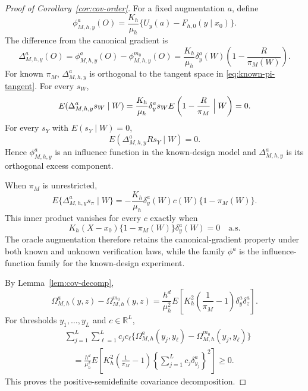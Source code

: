 \begin{proof}[Proof of Corollary~\ref{cor:cov-order}]
For a fixed augmentation \(a\), define
\[
\phi_{M,h,y}^{a}(O)
=
\frac{K_h}{\mu_h}
\{U_y(a)-F_{h,0}(y\mid x_0)\}.
\]
The difference from the canonical gradient is
\begin{equation}
\Delta_{M,h,y}^{a}(O)
=
\phi_{M,h,y}^{a}(O)-\phi_{M,h,y}^{m_0}(O)
=
\frac{K_h}{\mu_h}\delta_y^a(W)
\left(1-\frac{R}{\pi_M(W)}\right).
\label{eq:augmentation-orthogonal-component}
\end{equation}
For known \(\pi_M\), \(\Delta_{M,h,y}^{a}\) is orthogonal to the tangent space in \eqref{eq:known-pi-tangent}. For every \(s_W\),
\[
E(\Delta_{M,h,y}^{a}s_W\mid W)
=
\frac{K_h}{\mu_h}\delta_y^as_W
E\left(1-\frac{R}{\pi_M}\Bigm|W\right)=0.
\]
For every \(s_Y\) with \(E(s_Y\mid W)=0\),
\[
E(\Delta_{M,h,y}^{a}R s_Y\mid W)=0.
\]
Hence \(\phi_{M,h,y}^{a}\) is an influence function in the known-design model and \(\Delta_{M,h,y}^{a}\) is its orthogonal excess component.

When \(\pi_M\) is unrestricted,
\begin{equation}
E\{\Delta_{M,h,y}^{a}s_\pi\mid W\}
=
-\frac{K_h}{\mu_h}
\delta_y^a(W)c(W)\{1-\pi_M(W)\}.
\label{eq:augmentation-propensity-inner-product}
\end{equation}
This inner product vanishes for every \(c\) exactly when
\[
K_h(X-x_0)\{1-\pi_M(W)\}\delta_y^a(W)=0
\quad\text{a.s.}
\]
The oracle augmentation therefore retains the canonical-gradient property under both known and unknown verification laws, while the family \(\phi^a\) is the influence-function family for the known-design experiment.

By Lemma~\ref{lem:cov-decomp},
\[
\Omega_{M,h}^a(y,z)-\Omega_{M,h}^{m_0}(y,z)
=
\frac{h^d}{\mu_h^2}
E\left[
K_h^2
\left(\frac1{\pi_M}-1\right)
\delta_y^a\delta_z^a
\right].
\]
For thresholds \(y_1,\ldots,y_L\) and \(c\in\mathbb R^L\),
\[
\begin{aligned}
&\sum_{j=1}^L\sum_{\ell=1}^L
c_jc_\ell
\{\Omega_{M,h}^a(y_j,y_\ell)-\Omega_{M,h}^{m_0}(y_j,y_\ell)\}\\
&\quad=
\frac{h^d}{\mu_h^2}
E\left[
K_h^2
\left(\frac1{\pi_M}-1\right)
\left\{\sum_{j=1}^Lc_j\delta_{y_j}^a\right\}^2
\right]
\ge0.
\end{aligned}
\]
This proves the positive-semidefinite covariance decomposition.
\end{proof}

